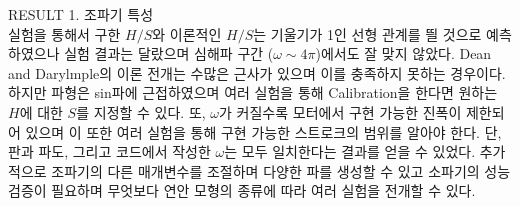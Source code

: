 \documentclass[a0paper,portrait]{baposter}
\begin{document}
\begin{poster}
\begin{posterbox}[name=result,column=2,below=wtank]{RESULT}
\small {1. 조파기 특성\\}
    \scriptsize{
    실험을 통해서 구한 $H/S$와 이론적인 $H/S$는 기울기가 1인 선형 관계를 띌 것으로 예측하였으나 실험 결과는 달랐으며 심해파 구간 ($\omega\sim4\pi$)에서도 잘 맞지 않았다. Dean and Darylmple의 이론 전개는 수많은 근사가 있으며 이를 충족하지 못하는 경우이다. 하지만 파형은 sin파에 근접하였으며 여러 실험을 통해 Calibration을 한다면 원하는 $H$에 대한 $S$를 지정할 수 있다. 또, $\omega$가 커질수록 모터에서 구현 가능한 진폭이 제한되어 있으며 이 또한 여러 실험을 통해 구현 가능한 스트로크의 범위를 알아야 한다. 단, 판과 파도, 그리고 코드에서 작성한 $\omega$는 모두 일치한다는 결과를 얻을 수 있었다. 추가적으로 조파기의 다른 매개변수를 조절하며 다양한 파를 생성할 수 있고 소파기의 성능 검증이 필요하며 무엇보다 연안 모형의 종류에 따라 여러 실험을 전개할 수 있다.
    }
    



\end{posterbox}
\end{poster}
\end{document}
